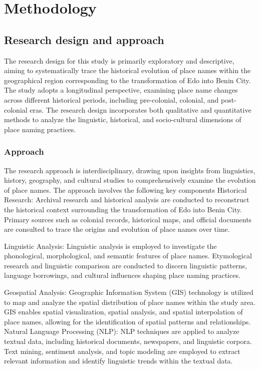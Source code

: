 \chapter{Methodology}
\section{Research design and approach}
The research design for this study is primarily exploratory and descriptive, aiming to systematically trace the historical evolution of place names within the geographical region corresponding to the transformation of Edo into Benin City. The study adopts a longitudinal perspective, examining place name changes across different historical periods, including pre-colonial, colonial, and post-colonial eras. The research design incorporates both qualitative and quantitative methods to analyze the linguistic, historical, and socio-cultural dimensions of place naming practices.
\subsection{Approach}
The research approach is interdisciplinary, drawing upon insights from linguistics, history, geography, and cultural studies to comprehensively examine the evolution of place names. The approach involves the following key components
Historical Research: Archival research and historical analysis are conducted to reconstruct the historical context surrounding the transformation of Edo into Benin City. Primary sources such as colonial records, historical maps, and official documents are consulted to trace the origins and evolution of place names over time.

Linguistic Analysis: Linguistic analysis is employed to investigate the phonological, morphological, and semantic features of place names. Etymological research and linguistic comparison are conducted to discern linguistic patterns, language borrowings, and cultural influences shaping place naming practices.

Geospatial Analysis: Geographic Information System (GIS) technology is utilized to map and analyze the spatial distribution of place names within the study area. GIS enables spatial visualization, spatial analysis, and spatial interpolation of place names, allowing for the identification of spatial patterns and relationships.
Natural Language Processing (NLP): NLP techniques are applied to analyze textual data, including historical documents, newspapers, and linguistic corpora. Text mining, sentiment analysis, and topic modeling are employed to extract relevant information and identify linguistic trends within the textual data.

